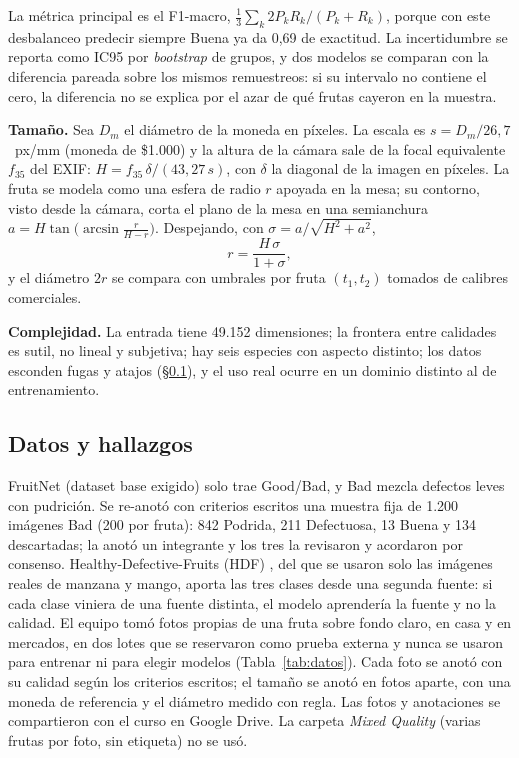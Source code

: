 \documentclass[conference,a4paper]{IEEEtran}
\begin{document}
La métrica principal es el F1-macro, $\frac{1}{3}\sum_k 2P_kR_k/(P_k+R_k)$, porque con este
desbalanceo predecir siempre Buena ya da 0,69 de exactitud. La incertidumbre se reporta como IC95 por
\emph{bootstrap} de grupos, y dos modelos se comparan con la diferencia pareada sobre los mismos
remuestreos: si su intervalo no contiene el cero, la diferencia no se explica por el azar de qué
frutas cayeron en la muestra.

\textbf{Tamaño.} Sea $D_m$ el diámetro de la moneda en píxeles. La escala es $s=D_m/26{,}7$~px/mm
(moneda de \$1.000) y la altura de la cámara sale de la focal equivalente $f_{35}$ del EXIF:
$H=f_{35}\,\delta/(43{,}27\,s)$, con $\delta$ la diagonal de la imagen en píxeles. La fruta se modela
como una esfera de radio $r$ apoyada en la mesa; su contorno, visto desde la cámara, corta el plano de
la mesa en una semianchura $a=H\tan\bigl(\arcsin\tfrac{r}{H-r}\bigr)$. Despejando, con
$\sigma=a/\sqrt{H^2+a^2}$,
\begin{equation}
r=\frac{H\,\sigma}{1+\sigma},
\label{eq:size}
\end{equation}
y el diámetro $2r$ se compara con umbrales por fruta $(t_1,t_2)$ tomados de calibres comerciales.

\textbf{Complejidad.} La entrada tiene 49.152 dimensiones; la frontera entre calidades es sutil, no
lineal y subjetiva; hay seis especies con aspecto distinto; los datos esconden fugas y atajos
(§\ref{sec:datos}), y el uso real ocurre en un dominio distinto al de entrenamiento.

\subsection{Datos y hallazgos}\label{sec:datos}

FruitNet \cite{meshram2022} (dataset base exigido) solo trae Good/Bad, y Bad mezcla defectos leves
con pudrición. Se re-anotó con criterios escritos una muestra fija de 1.200 imágenes Bad (200 por
fruta): 842 Podrida, 211 Defectuosa, 13 Buena y 134 descartadas; la anotó un integrante y los tres la
revisaron y acordaron por consenso. Healthy-Defective-Fruits (HDF)
\cite{pacheco2023}, del que se usaron solo las imágenes reales de manzana y mango, aporta las tres
clases desde una segunda fuente: si cada clase viniera de una fuente distinta, el modelo aprendería la
fuente y no la calidad. El equipo tomó fotos propias de una fruta sobre fondo claro, en casa y en
mercados, en dos lotes que se reservaron como prueba externa y nunca se usaron para entrenar ni para
elegir modelos (Tabla~\ref{tab:datos}). Cada foto se anotó con su calidad según los criterios
escritos; el tamaño se anotó en fotos aparte, con una moneda de referencia y el diámetro medido con
regla. Las fotos y anotaciones se compartieron con el curso en Google Drive. La carpeta \emph{Mixed
Quality} (varias frutas por foto, sin etiqueta) no se usó.
\end{document}
